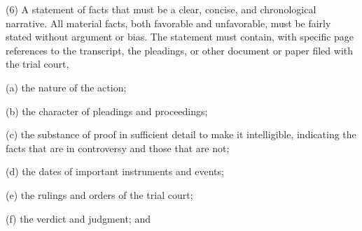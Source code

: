 \documentclass[12pt,\documentclassflag]{michiganCourtOfAppealsBrief}
\newcommand{\cmark}{\ding{51}}%
\newcommand{\xmark}{\ding{55}}%
\newcommand{\done}{\rlap{$\square$}{\raisebox{2pt}{\large\hspace{1pt}\cmark}}%
\hspace{-2.5pt}}
\newcommand{\wontfix}{\rlap{$\square$}{\large\hspace{1pt}\xmark}}
\begin{document}
\begin{todolist}


  
      \item
      (6) A statement of facts that must be a clear, concise, and chronological narrative. All material facts, both favorable and unfavorable, must be fairly stated without argument or bias. The statement must contain, with specific page references to the transcript, the pleadings, or other document or paper filed with the trial court,

      \item (a) the nature of the action;

      \item (b) the character of pleadings and proceedings;

      \item (c) the substance of proof in sufficient detail to make it intelligible, indicating the facts that are in controversy and those that are not;

      \item (d) the dates of important instruments and events;

      \item (e) the rulings and orders of the trial court;

      \item (f) the verdict and judgment; and


\end{todolist}
\end{document}
